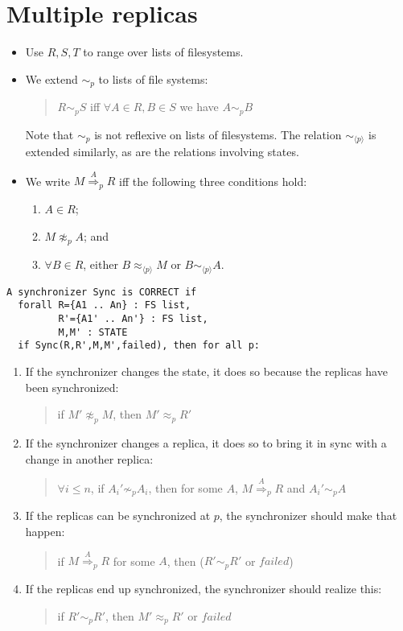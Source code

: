 \documentclass[12pt]{article}
\newcommand{\failed}{\ensuremath{\mathit{failed}}}
\newcommand{\agreeAt}[1]{\sim_{#1}}
\newcommand{\agreeAround}[1]{\sim_{\langle #1\rangle}}
\newcommand{\AgreeAt}[1]{\approx_{#1}}
\newcommand{\AgreeAround}[1]{\approx_{\langle #1\rangle}}
\newcommand{\convergesTo}[2]{\stackrel{#1}{\Longrightarrow}_{#2}}
\begin{document}
\section{Multiple replicas}

\begin{itemize}
\item 
Use $R,S,T$ to range over lists of filesystems.

\item We extend $\agreeAt{p}$ to lists of file systems:
  \begin{quote}
    $R \agreeAt{p} S$ iff $\forall A\in R,B\in S$ we have $A \agreeAt{p} B$
  \end{quote}
  Note that $\agreeAt{p}$ is not reflexive on lists of filesystems.
  The relation $\agreeAround{p}$ is extended
  similarly, as are the relations involving states.
  
\item We write $M \convergesTo{A}{p} R$ iff the following three
  conditions hold:
  \begin{enumerate}
  \item $A\in R$;
  \item $M\not\AgreeAt{p} A$; and
  \item $\forall B\in R$, either $B\AgreeAround{p} M$ or
    $B\agreeAround{p} A$.
  \end{enumerate}
\end{itemize}

\begin{verbatim}
A synchronizer Sync is CORRECT if
  forall R={A1 .. An} : FS list,
         R'={A1' .. An'} : FS list,
         M,M' : STATE
  if Sync(R,R',M,M',failed), then for all p:
\end{verbatim}
\begin{enumerate}
\item If the synchronizer changes the state, it does so because the
  replicas have been synchronized:
  \begin{quote}
    if $M'\not\AgreeAt{p} M$,
    then $M'\AgreeAt{p} R'$
  \end{quote}
  
\item If the synchronizer changes a replica, it does so to bring it in
  sync with a change in another replica:
  \begin{quote}
    $\forall i\leq n$,
    if $A_i'\not\agreeAt{p} A_i$,
    then for some $A$,  $M\convergesTo{A}{p} R$  and $A_i'\agreeAt{p} A$
  \end{quote}
  
\item If the replicas can be synchronized at $p$, the synchronizer
  should make that happen:
  \begin{quote}
    if $M\convergesTo{A}{p} R$ for some $A$,
    then ($R'\agreeAt{p} R'$ or $\failed$)
  \end{quote}
  
\item If the replicas end up synchronized, the synchronizer should
  realize this:
  \begin{quote}
    if $R'\agreeAt{p} R'$, then $ M'\AgreeAt{p}R'$ or $\failed$
  \end{quote}
\end{enumerate}
\end{document}
